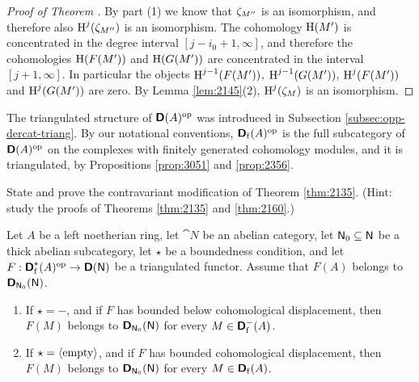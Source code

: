 \begin{proof}[Proof of Theorem \tup{\ref{thm:2135}}]
By part (1) we know that $\zeta_{M''}$ is an 
isomorphism, and therefore also $\operatorname{H}^j(\zeta_{M''})$ is an isomorphism. 
The cohomology $\operatorname{H}(M')$ is concentrated in the degree interval 
$[j - i_0 + 1, \infty]$, 
and therefore the cohomologies $\operatorname{H}(F(M'))$ and  $\operatorname{H}(G(M'))$
are concentrated in the interval $[j + 1, \infty]$. In particular the objects 
$\operatorname{H}^{j - 1}(F(M'))$, $\operatorname{H}^{j - 1}(G(M'))$, 
$\operatorname{H}^{j}(F(M'))$ and $\operatorname{H}^{j}(G(M'))$ are zero. 
By Lemma \ref{lem:2145}(2), $\operatorname{H}^j(\zeta_M)$ is an isomorphism.
\end{proof}

The triangulated structure of $\boldsymbol{\mathsf{D}}(A)^{\mathrm{op}}$ was introduced in 
Subsection \ref{subsec:opp-dercat-triang}. 
By our notational conventions, 
$\boldsymbol{\mathsf{D}}_{\mathrm{f}}(A)^{\mathrm{op}}$ is the full subcategory of 
$\boldsymbol{\mathsf{D}}(A)^{\mathrm{op}}$ on the complexes with finitely generated cohomology 
modules, and it is triangulated, by Propositions \ref{prop:3051} and 
\ref{prop:2356}. 

\begin{exer} \label{exer:4325}
State and prove the contravariant modification of Theorem \lb \ref{thm:2135}.
(Hint: study the proofs of Theorems \ref{thm:2135} and \ref{thm:2160}.)
\end{exer}

\begin{thm} \label{thm:2160}
Let $A$ be a left noetherian ring, let $\cat{N}$ be an abelian category, let
$\operatorname{\mathsf{N}}_0 \subseteq \operatorname{\mathsf{N}}$ be a thick abelian subcategory, let $\star$ be a 
boundedness condition, and let 
$F : \boldsymbol{\mathsf{D}}^{\star}_{\mathrm{f}}(A)^{\mathrm{op}} \to \boldsymbol{\mathsf{D}}(\operatorname{\mathsf{N}})$ 
be a triangulated functor. Assume that 
$F(A)$ belongs to $\boldsymbol{\mathsf{D}}_{\operatorname{\mathsf{N}}_0}(\operatorname{\mathsf{N}})$.
\begin{enumerate}
\item If $\star = -$, and if $F$ has bounded below cohomological displacement, 
then $F(M)$ belongs to $\boldsymbol{\mathsf{D}}_{\operatorname{\mathsf{N}}_0}(\operatorname{\mathsf{N}})$
for every $M \in \boldsymbol{\mathsf{D}}^-_{\mathrm{f}}(A)$.

\item If $\star = \langle \mathrm{empty} \rangle$, and if $F$ has bounded cohomological 
displacement, then $F(M)$ belongs to $\boldsymbol{\mathsf{D}}_{\operatorname{\mathsf{N}}_0}(\operatorname{\mathsf{N}})$
for every $M \in \boldsymbol{\mathsf{D}}_{\mathrm{f}}(A)$.
\end{enumerate} 
\end{thm}

